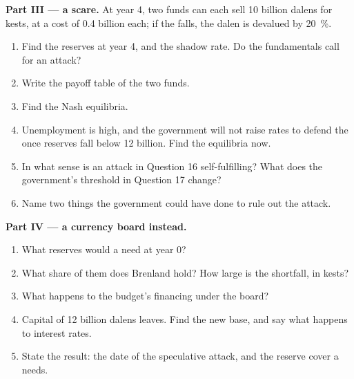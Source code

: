 \begin{problem}
\medskip\noindent\textbf{Part III --- a scare.} At year 4, two funds can each sell 10 billion
dalens for kests, at a cost of 0.4 billion each; if the  falls, the dalen is
devalued by 20~\%.
\begin{enumerate}[resume]
\item Find the reserves at year 4, and the shadow rate. Do the fundamentals call for
an attack?
\item Write the payoff table of the two funds.
\item Find the Nash equilibria.
\item Unemployment is high, and the government will not raise rates to defend the
 once reserves fall below 12 billion. Find the equilibria now.
\item In what sense is an attack in Question 16 self-fulfilling? What does the
government's threshold in Question 17 change?
\item Name two things the government could have done to rule out the attack.
\end{enumerate}

\medskip\noindent\textbf{Part IV --- a currency board instead.}
\begin{enumerate}[resume]
\item What reserves would a  need at year 0?
\item What share of them does Brenland hold? How large is the shortfall, in kests?
\item What happens to the budget's financing under the board?
\item Capital of 12 billion dalens leaves. Find the new base, and say what happens to
interest rates.
\item State the result: the date of the speculative attack, and the reserve cover a
 needs.
\end{enumerate}
\end{problem}
